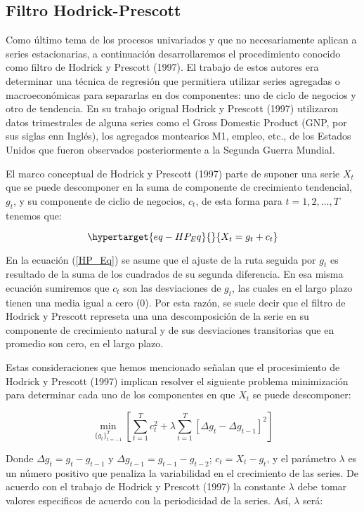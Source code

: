 \documentclass[
  a4paper,
]{article}
\begin{document}
\hypertarget{filtro-hodrick-prescott}{%
\subsection{Filtro Hodrick-Prescott}\label{filtro-hodrick-prescott}}

Como último tema de los procesos univariados y que no necesariamente
aplican a series estacionarias, a continuación desarrollaremos el
procedimiento conocido como filtro de Hodrick y Prescott (1997). El
trabajo de estos autores era determinar una técnica de regresión que
permitiera utilizar series agregadas o macroeconómicas para separarlas
en dos componentes: uno de ciclo de negocios y otro de tendencia. En su
trabajo orignal Hodrick y Prescott (1997) utilizaron datos trimestrales
de alguna series como el Gross Domestic Product (GNP, por sus siglas enn
Inglés), los agregados montearios M1, empleo, etc., de los Estados
Unidos que fueron observados posteriormente a la Segunda Guerra Mundial.

El marco conceptual de Hodrick y Prescott (1997) parte de suponer una
serie \(X_t\) que se puede descomponer en la suma de componente de
crecimiento tendencial, \(g_t\), y su componente de ciclio de negocios,
\(c_t\), de esta forma para \(t = 1, 2, \ldots, T\) tenemos que:

\begin{equation}\protect\hypertarget{eq-HP_Eq}{}{
X_t = g_t + c_t
}\label{eq-HP_Eq}\end{equation}

En la ecuación (\ref{HP_Eq}) se asume que el ajuste de la ruta seguida
por \(g_t\) es resultado de la suma de los cuadrados de su segunda
diferencia. En esa misma ecuación sumiremos que \(c_t\) son las
desviaciones de \(g_t\), las cuales en el largo plazo tienen una media
igual a cero (0). Por esta razón, se suele decir que el filtro de
Hodrick y Prescott represeta una una descomposición de la serie en su
componente de crecimiento natural y de sus desviaciones transitorias que
en promedio son cero, en el largo plazo.

Estas consideraciones que hemos mencionado señalan que el procesimiento
de Hodrick y Prescott (1997) implican resolver el siguiente problema
minimización para determinar cada uno de los componentes en que \(X_t\)
se puede descomponer:

\[
\min_{\{ g_t \}^T_{t = -1} } \left[ \sum^T_{t = 1} c^2_t + \lambda \sum^T_{t = 1} [ \Delta g_t - \Delta g_{t-1}]^2 \right]
\]

Donde \(\Delta g_t = g_t - g_{t-1}\) y
\(\Delta g_{t-1} = g_{t-1} - g_{t-2}\); \(c_t = X_t - g_t\), y el
parámetro \(\lambda\) es un número positivo que penaliza la variabilidad
en el crecimiento de las series. De acuerdo con el trabajo de Hodrick y
Prescott (1997) la constante \(\lambda\) debe tomar valores especificos
de acuerdo con la periodicidad de la series. Así, \(\lambda\) será:
\end{document}
